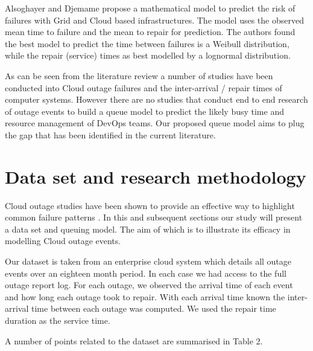 \documentclass[5p]{elsarticle}
\begin{document}
Alsoghayer and Djemame \cite {alsoghayer2014resource} propose a mathematical model to predict the risk of failures with Grid and Cloud based infrastructures. The model uses the observed mean time to failure and the mean to repair for prediction. The authors found the best model to predict the time between failures is a Weibull distribution, while the repair (service) times as best modelled by a lognormal distribution.

As can be seen from the literature review a number of studies have been conducted into Cloud outage failures and the inter-arrival / repair times of computer systems. However there are no studies that conduct end to end research of outage events to build a queue model to predict the likely busy time and resource management of DevOps teams. Our proposed queue model aims to plug the gap that has been identified in the current literature.

\section{Data set and research methodology}

Cloud outage studies have been shown to provide an effective way to highlight common failure patterns \cite{InfoWorld2015outage}. In this and subsequent sections our study will present a data set and queuing model. The aim of which is to illustrate its efficacy in modelling Cloud outage events. 

Our dataset is taken from an enterprise cloud system which details all outage events over an eighteen month period. In each case we had access to the full outage report log. For each outage, we observed the arrival time of each event and how long each outage took to repair. With each arrival time known the inter-arrival time between each outage was computed. We used the repair time duration as the service time.

A number of points related to the dataset are summarised in Table 2. 
\end{document}
